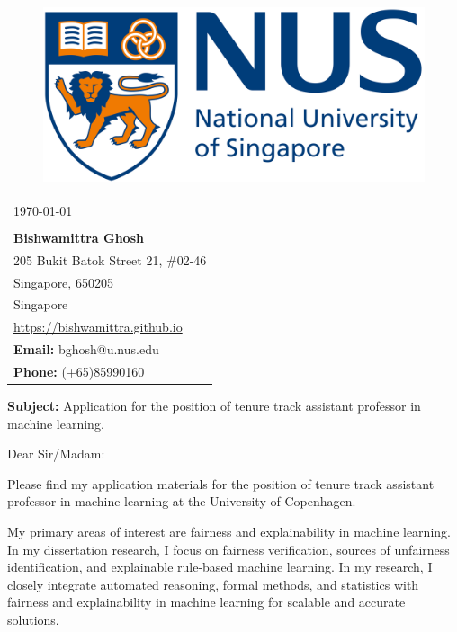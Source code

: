 \documentclass[a4paper,10pt]{article}
\newcommand{\blue}[1]{\textcolor{blue}{#1}}
\begin{document}
	
	
	
	\begin{figure}[t]
		\includegraphics[scale=0.03]{logo}
	\end{figure}
	\noindent\makebox[\linewidth]{\rule{\textwidth}{1pt}}
	
	
	\begin{flushright}
		\begin{tabular}{l@{}}
			\today \\
			\newline \\
			\textbf{Bishwamittra Ghosh}\\
			205 Bukit Batok Street 21, \#02-46\\ 
			Singapore, 650205\\
			Singapore\\
			\blue{\url{https://bishwamittra.github.io}}\\
			\textbf{Email:} bghosh@u.nus.edu\\
			\textbf{Phone:} (+65)85990160\\
		\end{tabular}%
	\end{flushright}


	\textbf{Subject:} Application for the position of tenure track assistant professor in machine learning. 
	
	
	
	\vspace{1em}
	Dear Sir/Madam:
	
	
	
	\vspace{1em}
	Please find my application materials for the position of tenure track assistant professor in machine learning at the University of Copenhagen.
	
	\vspace{1em}
	My primary areas of interest are  fairness and explainability in machine learning. In my dissertation research, I focus on  fairness verification, sources of unfairness identification, and  explainable rule-based machine learning. In my research, I closely integrate automated reasoning, formal methods, and statistics with fairness and explainability in machine learning for scalable and accurate solutions.
	
\end{document}

